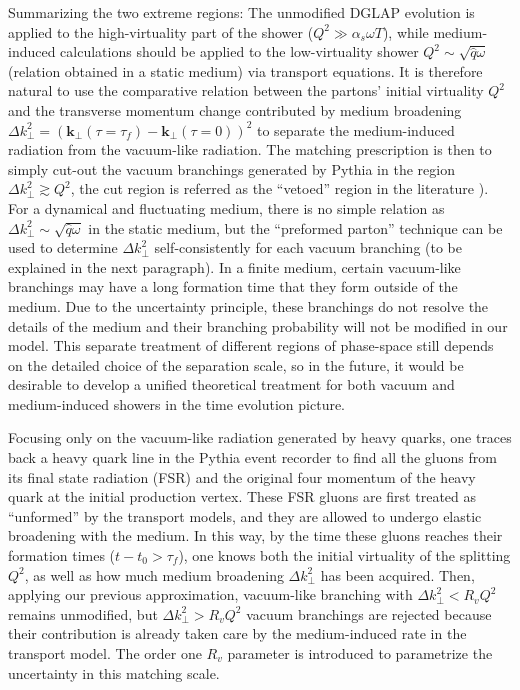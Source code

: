 Summarizing the two extreme regions:
The unmodified DGLAP evolution is applied to the high-virtuality part of the shower ($Q^2 \gg \alpha_s \omega T$), while medium-induced calculations should be applied to the low-virtuality shower $Q^2 \sim \sqrt{\hat{q}\omega}$ (relation obtained in a static medium) via transport equations.
It is therefore natural to use the comparative relation between the partons' initial virtuality $Q^2$ and the transverse momentum change contributed by medium broadening $\Delta k_\perp^2 = (\mathbf{k}_\perp(\tau=\tau_f) - \mathbf{k}_\perp(\tau=0))^2$ to separate the medium-induced radiation from the vacuum-like radiation.
The matching prescription is then to simply cut-out the vacuum branchings generated by Pythia in the region $\Delta k_\perp^2 \gtrsim Q^2$, the cut region is referred as the ``vetoed'' region in the literature \cite{PhysRevLett.120.232001}).
For a dynamical and fluctuating medium, there is no simple relation as $\Delta k_\perp^2\sim \sqrt{\hat{q}\omega}$ in the static medium, but the ``preformed parton'' technique can be used to determine $\Delta k_\perp^2$ self-consistently for each vacuum branching (to be explained in the next paragraph).
In a finite medium, certain vacuum-like branchings may have a long formation time that they form outside of the medium.
Due to the uncertainty principle, these branchings do not resolve the details of the medium and their branching probability will not be modified in our model.
This separate treatment of different regions of phase-space still depends on the detailed choice of the separation scale, so in the future, it would be desirable to develop a unified theoretical treatment for both vacuum and medium-induced showers in the time evolution picture.

Focusing only on the vacuum-like radiation generated by heavy quarks, one traces back a heavy quark line in the Pythia event recorder to find all the gluons from its final state radiation (FSR) and the original four momentum of the heavy quark at the initial production vertex.
These FSR gluons are first treated as ``unformed'' by the transport models, and they are allowed to undergo elastic broadening with the medium.
In this way, by the time these gluons reaches their formation times ($t-t_0>\tau_f$), one knows both the initial virtuality of the splitting $Q^2$, as well as how much medium broadening $\Delta k_\perp^2$ has been acquired.
Then, applying our previous approximation, vacuum-like branching with 
$\Delta k_\perp^2 < R_v Q^2$ remains unmodified, but $\Delta k_\perp^2 > R_v Q^2$ vacuum branchings are rejected because their contribution is already taken care by the medium-induced rate in the transport model.
The order one $R_v$ parameter is introduced to parametrize the uncertainty in this matching scale.

